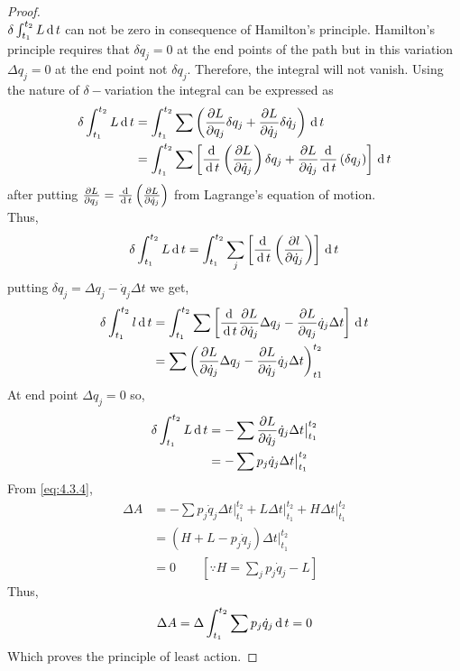 \documentclass[12pt]{article}
\newcommand{\inttt}{\int_{t_1}^{t_2}}
\begin{document}
\begin{soln}
\begin{proof}
\begin{equation}
        \end{equation}
        \(\delta \int_{t_1}^{t_2}L \,\mathrm{d}\, t\) can not be zero in consequence of Hamilton's principle. Hamilton's principle requires that \(\delta q_j=0\) at the end points of the path but in this variation \(\Delta q_j=0\) at the end point not \(\delta q_j\). Therefore, the integral will not vanish. Using the nature of \(\delta-\)variation the integral can be expressed as
        \begin{align*}
            \delta \int_{t_1}^{t_2} L \D t&=\inttt \sum \left(\frac{\partial L}{\partial q_j}\delta q_j+\frac{\partial L}{\partial \dot{q}_j}\delta \dot{q}_j\right)\D t\\
            &=\inttt \sum \left[\frac{\D}{\D t}\left(\frac{\partial L}{\partial \dot{q}_j}\right)\delta q_j+\frac{\partial L}{\partial \dot{q}_j}\frac{\D}{\D t}\left(\delta q_j\right)\right]\D t
        \end{align*}
        after putting \(\frac{\partial L}{\partial q_j}=\frac{\,\mathrm{d}\,}{\,\mathrm{d}\, t}\left(\frac{\partial L}{\partial \dot{q}_j}\right)\) from Lagrange's equation of motion.\\
        Thus,
        \[\delta \inttt L\D t=\inttt \sum_j \left[\frac{\D}{\D t}\left(\frac{\partial l}{\partial \dot{q}_j}\right)\right]\D t\]
        putting \(\delta q_j =\Delta q_j-\dot{q}_j \Delta t\) we get,
        \begin{align*}
            \delta \inttt l \D t&= \inttt \sum \left[\frac{\D }{\D t}\frac{\partial L}{\partial \dot{q}_j}\Delta q_j -\frac{\partial L}{\partial q_j}\dot{q}_j \Delta t\right]\D t\\
            &=\sum \left(\frac{\partial L}{\partial \dot{q}_j}\Delta q_j -\frac{\partial L}{\partial \dot{q}_j}\dot{q}_j \Delta t\right)_{t1}^{t_2}
        \end{align*}
        At end point \(\Delta q_j=0\) so,
        \begin{align*}
            \delta \inttt L \D t&=-\sum \frac{\partial L}{\partial \dot{q}_j}\dot{q}_j \Delta t\big\vert_{t_1}^{t_2}\\
            &=-\sum p_j\dot{q}_j \Delta t\big\vert_{t_1}^{t_2}
        \end{align*}
        From \eqref{eq:4.3.4},
        \begin{align*}
            \Delta A&=-\sum p_j \dot{q}_j\Delta t\big\vert_{t_1}^{t_2}+L\Delta t\big\vert_{t_1}^{t_2}+H\Delta t\big\vert_{t_1}^{t_2}\\
            &=(H+L-p_j\dot{q}_j)\Delta t\big\vert_{t_1}^{t_2}\\
            &=0\qquad [\because H=\sum_j p_j\dot{q}_j -L]
        \end{align*}
        Thus, \[\Delta A=\Delta \inttt \sum p_j \dot{q}_j\D t=0\]
        Which proves the principle of least action. 
    \end{proof} 
\end{soln}
\end{document}
